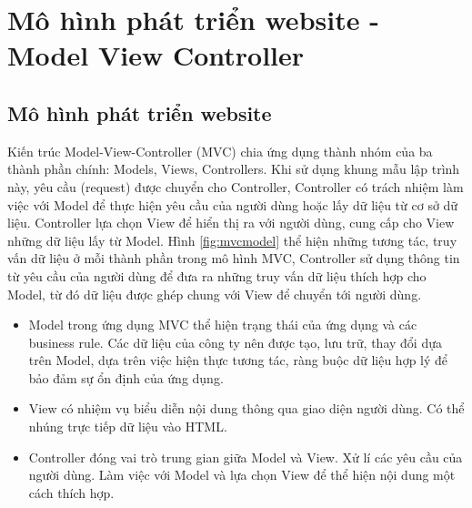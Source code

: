    




\section{Mô hình phát triển website - Model View Controller}
\subsection{Mô hình phát triển website}
Kiến trúc Model-View-Controller (MVC) chia ứng dụng thành nhóm của ba thành phần chính: Models, Views, Controllers. Khi sử dụng khung mẫu lập trình này, yêu cầu (request) được chuyển cho Controller, Controller có trách nhiệm làm việc với Model để thực hiện yêu cầu của người dùng hoặc lấy dữ liệu từ cơ sở dữ liệu. Controller lựa chọn View để hiển thị ra với người dùng, cung cấp cho View những dữ liệu lấy từ Model.
Hình \ref{fig:mvcmodel} thể hiện những tương tác, truy vấn dữ liệu ở mỗi thành phần trong mô hình MVC, Controller sử dụng thông tin từ yêu cầu của người dùng để đưa ra những truy vấn dữ liệu thích hợp cho Model, từ đó dữ liệu được ghép chung với View để chuyển tới người dùng.
\begin{itemize}
    \item Model trong ứng dụng MVC thể hiện trạng thái của ứng dụng và các business rule. Các dữ liệu của công ty nên được tạo, lưu trữ, thay đổi dựa trên Model, dựa trên việc hiện thực tương tác, ràng buộc dữ liệu hợp lý để bảo đảm sự ổn định của ứng dụng.
    \item View có nhiệm vụ biểu diễn nội dung thông qua giao diện người dùng. Có thể nhúng trực tiếp dữ liệu vào HTML.
    \item Controller đóng vai trò trung gian giữa Model và View. Xử lí các yêu cầu của người dùng. Làm việc với Model và lựa chọn View để thể hiện nội dung một cách thích hợp.
\end{itemize}

